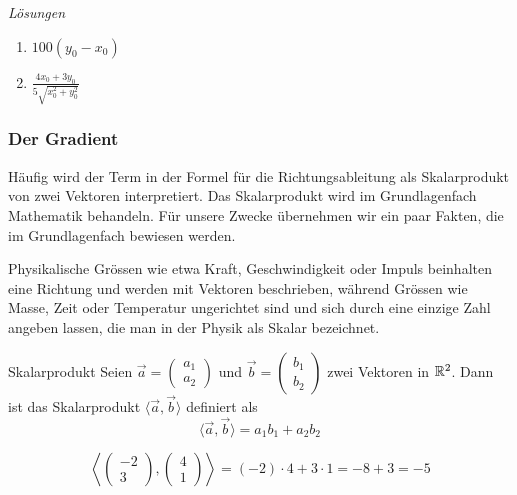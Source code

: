 \clearpage
\emph{Lösungen}
\begin{enumerate}
	\item $100(y_0-x_0)$
	\item $\frac{4x_0+3y_0}{5\sqrt{x_0^2 + y_0^2}}$
\end{enumerate}




















\clearpage
\subsubsection*{Der Gradient}
Häufig wird der Term in der Formel für die Richtungsableitung als Skalarprodukt von zwei Vektoren interpretiert. Das Skalarprodukt wird im Grundlagenfach Mathematik behandeln. Für unsere Zwecke übernehmen wir ein paar Fakten, die im Grundlagenfach bewiesen werden.

Physikalische Grössen wie etwa Kraft, Geschwindigkeit oder Impuls beinhalten eine Richtung und werden mit Vektoren beschrieben, während Grössen wie Masse, Zeit oder Temperatur ungerichtet sind und sich durch eine einzige Zahl angeben lassen, die man in der Physik als Skalar bezeichnet.

\begin{definition}
	{Skalarprodukt}{}
	Seien $\vec{a}=\begin{pmatrix}
			a_1 \\a_2
		\end{pmatrix}$ und $\vec{b} = \begin{pmatrix}
			b_1 \\b_2
		\end{pmatrix}$ zwei Vektoren in $\mathbb{R}^2$. Dann ist das Skalarprodukt $\langle \vec{a}, \vec{b} \rangle$  definiert als
	$$ \langle \vec{a}, \vec{b} \rangle = a_1b_1 + a_2b_2$$
\end{definition}

\begin{bsp}
	{}{}
	$$\left\langle \begin{pmatrix} -2 \\ 3 \end{pmatrix}
		,
		\begin{pmatrix} 4 \\ 1 \end{pmatrix}
		\right\rangle
		= (-2) \cdot 4 + 3 \cdot 1
		= -8 + 3 = -5 $$
\end{bsp}

